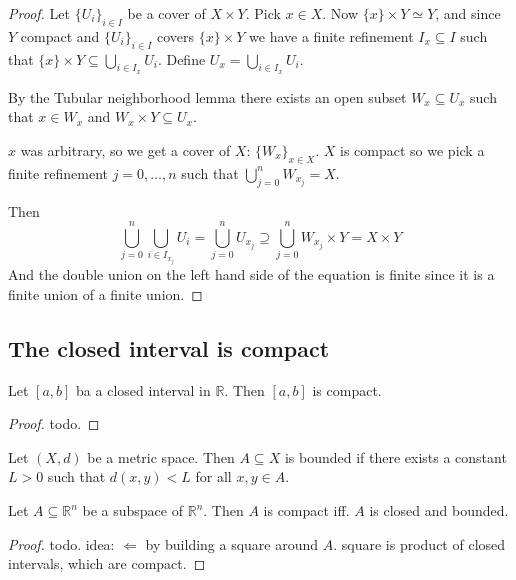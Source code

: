 \begin{proof}
  Let \( \{ U_i \}_{i \in I}  \) be a cover of
  \( X \times Y \).
  Pick \( x \in X \). Now \( \{ x \} \times Y \simeq Y \),
  and since \( Y \) compact and \( \{ U_i \}_{i \in I}  \)
  covers \( \{ x \} \times Y \)
  we have a finite refinement \( I_x \subseteq I \)
  such that \(\{ x \} \times Y \subseteq  \bigcup_{i \in I_x} U_i \).
  Define \( U_x = \bigcup_{i \in I_x} U_i \).

  By the Tubular neighborhood lemma there exists
  an open subset \( W_x \subseteq U_x \) such that
  \( x \in W_x \) and \( W_x \times Y \subseteq U_x \).

  \( x \) was arbitrary, so we get a cover of \( X \):
  \( \{ W_x \}_{x \in X}  \). \( X \) is compact
  so we pick a finite refinement \( j = 0, \dots, n \) such that
  \( \bigcup_{j = 0}^n W_{x_j} = X \).

  Then
  \[
    \bigcup_{j = 0}^n \bigcup_{i \in I_{x_j}} U_i
    = \bigcup_{j = 0}^n U_{x_j}
    \supseteq \bigcup_{j=0}^n W_{x_j} \times Y = X \times Y
  \] 
  And the double union on the left hand side
  of the equation is finite since it is a
  finite union of a finite union.
\end{proof}

\subsection{The closed interval is compact}

\begin{theorem}
  Let \( [a, b] \) ba a closed interval in \( \mathbb{R} \).
  Then \( [a, b] \) is compact.
\end{theorem}

\begin{proof}
    todo.
\end{proof}

\begin{definition}[boundedness]
    Let \( (X, d) \) be a metric space.
    Then \( A \subseteq X \) is bounded if there exists
    a constant \( L > 0 \) such that \( d(x, y) < L \)  for all \( x, y \in A \).
\end{definition}

\begin{theorem}
  Let \( A \subseteq \mathbb{R}^n \) be a subspace of \( \mathbb{R}^n \).
  Then \( A \) is compact iff. \( A \) is closed and bounded.
\end{theorem}

\begin{proof}
    todo.
    idea: \( \Leftarrow \) by building a square around \( A \). square is product of closed intervals, which are compact.
\end{proof}

